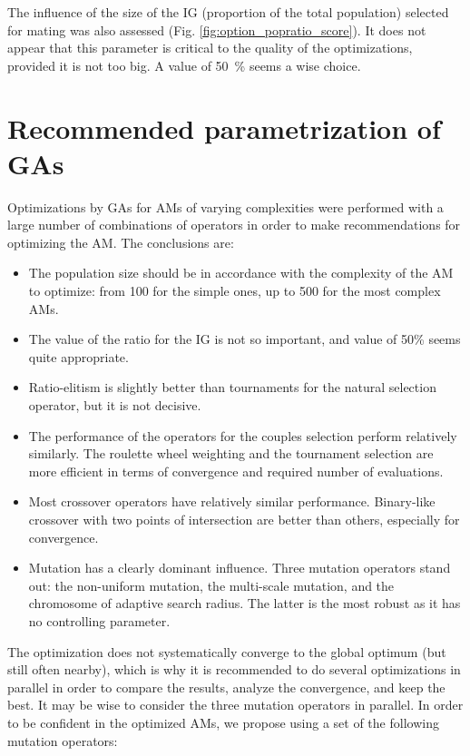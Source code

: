 \documentclass{ametsoc}
\begin{document}
The influence of the size of the IG (proportion of the total population) selected for mating was also assessed (Fig. \ref{fig:option_popratio_score}). It does not appear that this parameter is critical to the quality of the optimizations, provided it is not too big. A value of 50~\% seems a wise choice.


\section{Recommended parametrization of GAs}
\label{sec:recommendations}

Optimizations by GAs for AMs of varying complexities were performed with a large number of combinations of operators in order to make recommendations for optimizing the AM. The conclusions are:

\begin{itemize}
	\item The population size should be in accordance with the complexity of the AM to optimize: from 100 for the simple ones, up to 500 for the most complex AMs.
	
	\item The value of the ratio for the IG is not so important, and value of 50\% seems quite appropriate.
	
	\item Ratio-elitism is slightly better than tournaments for the natural selection operator, but it is not decisive.
	
	\item The performance of the operators for the couples selection perform relatively similarly. The roulette wheel weighting and the tournament selection are more efficient in terms of convergence and required number of evaluations.
	
	\item Most crossover operators have relatively similar performance. Binary-like crossover with two points of intersection are better than others, especially for convergence.
	
	\item Mutation has a clearly dominant influence. Three mutation operators stand out: the non-uniform mutation, the multi-scale mutation, and the chromosome of adaptive search radius. The latter is the most robust as it has no controlling parameter.
	
\end{itemize}

The optimization does not systematically converge to the global optimum (but still often nearby), which is why it is recommended to do several optimizations in parallel in order to compare the results, analyze the convergence, and keep the best. It may be wise to consider the three mutation operators in parallel. In order to be confident in the optimized AMs, we propose using a set of the following mutation operators:
\end{document}
